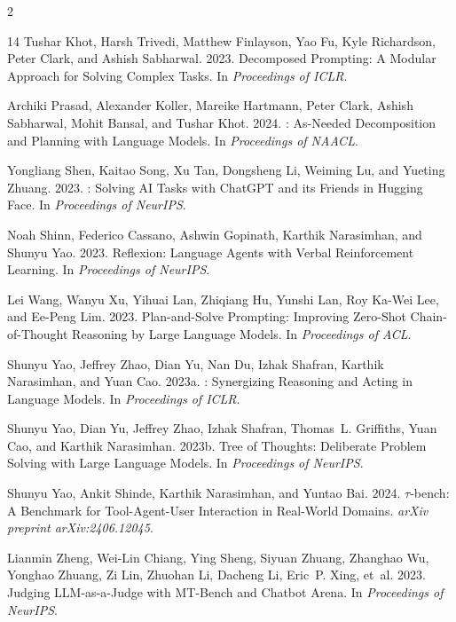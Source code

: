 \documentclass[11pt,a4paper]{article}
\begin{document}
\begin{multicols}{2}
\begin{thebibliography}{14}
Tushar Khot, Harsh Trivedi, Matthew Finlayson, Yao Fu, Kyle Richardson, Peter Clark, and Ashish Sabharwal. 2023.
\newblock Decomposed Prompting: A Modular Approach for Solving Complex Tasks.
\newblock In \emph{Proceedings of ICLR}.

Archiki Prasad, Alexander Koller, Mareike Hartmann, Peter Clark, Ashish Sabharwal, Mohit Bansal, and Tushar Khot. 2024.
: As-Needed Decomposition and Planning with Language Models.
\newblock In \emph{Proceedings of NAACL}.

Yongliang Shen, Kaitao Song, Xu Tan, Dongsheng Li, Weiming Lu, and Yueting Zhuang. 2023.
: Solving {AI} Tasks with {ChatGPT} and its Friends in {Hugging Face}.
\newblock In \emph{Proceedings of NeurIPS}.

Noah Shinn, Federico Cassano, Ashwin Gopinath, Karthik Narasimhan, and Shunyu Yao. 2023.
\newblock Reflexion: Language Agents with Verbal Reinforcement Learning.
\newblock In \emph{Proceedings of NeurIPS}.

Lei Wang, Wanyu Xu, Yihuai Lan, Zhiqiang Hu, Yunshi Lan, Roy Ka-Wei Lee, and Ee-Peng Lim. 2023.
\newblock Plan-and-Solve Prompting: Improving Zero-Shot Chain-of-Thought Reasoning by Large Language Models.
\newblock In \emph{Proceedings of ACL}.

Shunyu Yao, Jeffrey Zhao, Dian Yu, Nan Du, Izhak Shafran, Karthik Narasimhan, and Yuan Cao. 2023a.
: Synergizing Reasoning and Acting in Language Models.
\newblock In \emph{Proceedings of ICLR}.

Shunyu Yao, Dian Yu, Jeffrey Zhao, Izhak Shafran, Thomas~L. Griffiths, Yuan Cao, and Karthik Narasimhan. 2023b.
\newblock Tree of Thoughts: Deliberate Problem Solving with Large Language Models.
\newblock In \emph{Proceedings of NeurIPS}.

Shunyu Yao, Ankit Shinde, Karthik Narasimhan, and Yuntao Bai. 2024.
\newblock $\tau$-bench: A Benchmark for Tool-Agent-User Interaction in Real-World Domains.
\newblock \emph{arXiv preprint arXiv:2406.12045}.

Lianmin Zheng, Wei-Lin Chiang, Ying Sheng, Siyuan Zhuang, Zhanghao Wu, Yonghao Zhuang, Zi Lin, Zhuohan Li, Dacheng Li, Eric~P. Xing, et~al. 2023.
\newblock Judging {LLM}-as-a-Judge with {MT}-Bench and Chatbot Arena.
\newblock In \emph{Proceedings of NeurIPS}.


\end{thebibliography}
\end{multicols}
\end{document}
